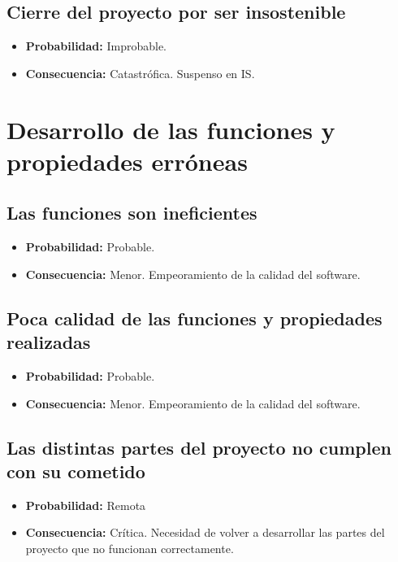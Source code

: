 \documentclass[spanish,a4paper,12pt]{report}	%
\begin{document}
\subsection*{Cierre del proyecto por ser insostenible}
	\begin{itemize}
		\item \textbf {Probabilidad: }Improbable.
		\item \textbf {Consecuencia: }Catastrófica. Suspenso en IS.
	\end{itemize}

%
\section{Desarrollo de las funciones y propiedades erróneas}

\subsection*{Las funciones son ineficientes}
	\begin{itemize}
		\item \textbf {Probabilidad: }Probable.
		\item \textbf {Consecuencia: }Menor. Empeoramiento de la calidad del software.
	\end{itemize}

\subsection*{Poca calidad de las funciones y propiedades realizadas}
	\begin{itemize}
		\item \textbf {Probabilidad: }Probable.
		\item \textbf {Consecuencia: }Menor. Empeoramiento de la calidad del software.
	\end{itemize}

\subsection*{Las distintas partes del proyecto no cumplen con su cometido}
	\begin{itemize}
		\item \textbf {Probabilidad: }Remota
		\item \textbf {Consecuencia: }Crítica. Necesidad de volver a desarrollar las partes del proyecto que no funcionan correctamente.
	\end{itemize}
\end{document}
